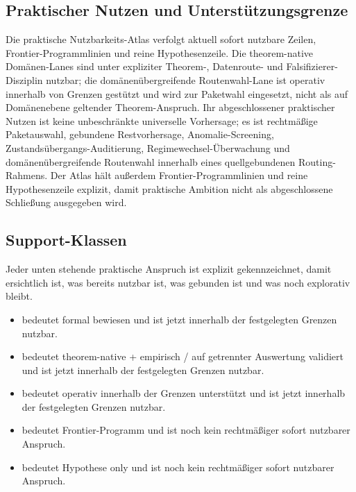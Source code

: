 \subsection{Praktischer Nutzen und Unterstützungsgrenze}
Die praktische Nutzbarkeits-Atlas verfolgt aktuell  sofort nutzbare Zeilen,  Frontier-Programmlinien und  reine Hypothesenzeile.
Die theorem-native Domänen-Lanes sind unter expliziter Theorem-, Datenroute- und Falsifizierer-Disziplin nutzbar; die domänenübergreifende Routenwahl-Lane ist operativ innerhalb von Grenzen gestützt und wird zur Paketwahl eingesetzt, nicht als auf Domänenebene geltender Theorem-Anspruch.
Ihr abgeschlossener praktischer Nutzen ist keine unbeschränkte universelle Vorhersage; es ist rechtmäßige Paketauswahl, gebundene Restvorhersage, Anomalie-Screening, Zustandsübergangs-Auditierung, Regimewechsel-Überwachung und domänenübergreifende Routenwahl innerhalb eines quellgebundenen Routing-Rahmens.
Der Atlas hält außerdem  Frontier-Programmlinien und  reine Hypothesenzeile explizit, damit praktische Ambition nicht als abgeschlossene Schließung ausgegeben wird.

\subsection{Support-Klassen}
Jeder unten stehende praktische Anspruch ist explizit gekennzeichnet, damit ersichtlich ist, was bereits nutzbar ist, was gebunden ist und was noch explorativ bleibt.
\begin{itemize}[leftmargin=1.6em,nosep]
\item {} bedeutet formal bewiesen und ist jetzt innerhalb der festgelegten Grenzen nutzbar.
\item {} bedeutet theorem-native + empirisch / auf getrennter Auswertung validiert und ist jetzt innerhalb der festgelegten Grenzen nutzbar.
\item {} bedeutet operativ innerhalb der Grenzen unterstützt und ist jetzt innerhalb der festgelegten Grenzen nutzbar.
\item {} bedeutet Frontier-Programm und ist noch kein rechtmäßiger sofort nutzbarer Anspruch.
\item {} bedeutet Hypothese only und ist noch kein rechtmäßiger sofort nutzbarer Anspruch.
\end{itemize}

